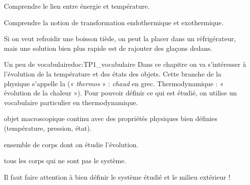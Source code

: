 \teteSndTran

\vspace*{-32pt}

\begin{objectifs}
  \item Comprendre le lien entre énergie et température.
  \item Comprendre la notion de transformation endothermique et exothermique.
\end{objectifs}

\begin{contexte}
  Si on veut refroidir une boisson tiède, on peut la placer dans un réfrigérateur, mais une solution bien plus rapide est de rajouter des glaçons dedans.
  
\end{contexte}


\begin{doc}{Un peu de vocabulaire}{doc:TP1_vocabulaire}
  Dans ce chapitre on va s'intéresser à l'évolution de la température et des états des objets.
  Cette branche de la physique s'appelle la  (« \textit{thermos} » : \textit{chaud} en grec. Thermodynamique : « évolution de la chaleur »).
  Pour pouvoir définir ce qui est étudié, on utilise un vocabulaire particulier en thermodynamique.
  
  \begin{importants}
    \begin{listePoints}
      \item {} objet macroscopique continu avec des propriétés physiques bien définies (température, pression, état).
      \item {} ensemble de corps dont on étudie l'évolution.
      \item {} tous les corps qui ne sont pas le système.
    \end{listePoints}
  \end{importants}
  \attention Il faut faire attention à bien définir le système étudié et le milieu extérieur !
\end{doc}

